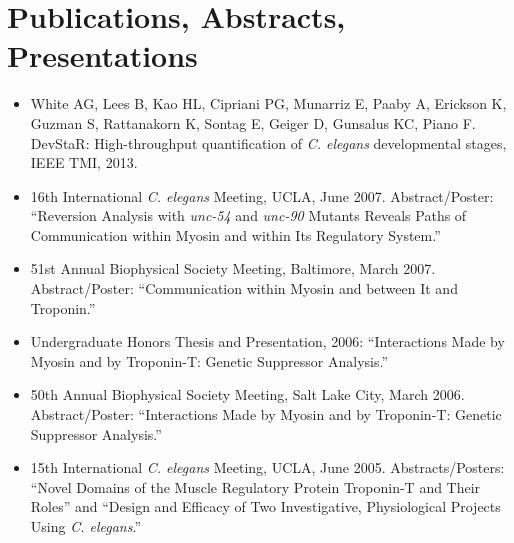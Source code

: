 \documentclass{article}
\begin{document}
	\section*{Publications, Abstracts, Presentations}
	\begin{itemize}
			\item White AG, Lees B, Kao HL, Cipriani PG, Munarriz E, Paaby A, Erickson K, Guzman S, 
			Rattanakorn K, Sontag E, Geiger D, Gunsalus KC, Piano F.
			DevStaR: High-throughput quantification of \emph{C. elegans} developmental stages, IEEE TMI, 2013.
			\item 16th International \emph{C. elegans} Meeting, UCLA, June 2007. 
			Abstract/Poster: ``Reversion Analysis with \emph{unc-54} and \emph{unc-90} Mutants Reveals Paths of Communication within Myosin and within Its Regulatory System.''
			\item 51st Annual Biophysical Society Meeting, Baltimore, March 2007.
			Abstract/Poster: ``Communication within Myosin and between It and Troponin.''
			\item Undergraduate Honors Thesis and Presentation, 2006: ``Interactions Made by Myosin and by Troponin-T: Genetic Suppressor Analysis.''
			\item 50th Annual Biophysical Society Meeting, Salt Lake City, March 2006.
			Abstract/Poster: ``Interactions Made by Myosin and by Troponin-T: Genetic Suppressor Analysis.''
			\item 15th International \emph{C. elegans} Meeting, UCLA, June 2005.
			Abstracts/Posters: ``Novel Domains of the Muscle Regulatory Protein Troponin-T and Their Roles'' and 
			``Design and Efficacy of Two Investigative, Physiological Projects Using \emph{C. elegans}.''
	\end{itemize}
\end{document}
